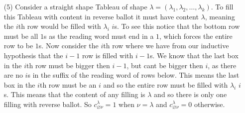 \documentclass[12pt]{amsart}
\theoremstyle{definition}
\let\emptyset\varnothing
\begin{document}
\begin{itemize}
\item[(5)] %
Consider a straight shape Tableau of shape $\lambda=(\lambda_1,\lambda_2,\dots,\lambda_k)$. To fill this Tableau with content in reverse ballot it must have content $\lambda$, meaning the $i$th row would be filled with $\lambda_i$ $i$s. To see this notice that the bottom row must be all $1$s as the reading word must end in a $1$, which forces the entire row to be $1$s. Now consider the $i$th row where we have from our inductive hypothesis that the $i-1$ row is filled with $i-1$s. We know that the last box in the $i$th row must be bigger then $i-1$, but cant be bigger then $i$, as there are no $i$s in the suffix of the reading word of rows below. This means the last box in the $i$th row must be an $i$ and so the entire row must be filled with $\lambda_i$ $i$s. This means that the content of any filling is $\lambda$ and so there is only one filling with reverse ballot. So $c_{\emptyset\nu}^\lambda=1$ when $\nu=\lambda$ and $c_{\emptyset\nu}^\lambda=0$ otherwise.
\end{itemize}
\end{document}
